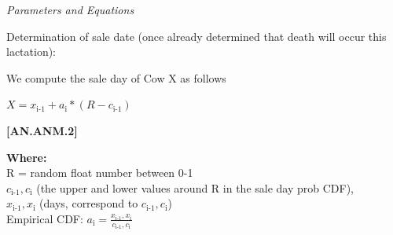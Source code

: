 \begin{refsection}
\begin{enumerate}
\begin{itemize}
         \end{itemize}


         \textit{Parameters and Equations}
         \vspace{0.1cm}

        Determination of sale date (once already determined that death will occur this lactation): 
        \vspace{0.2cm}

        We compute the sale day of Cow X as follows
        \vspace{0.5cm}
        
        \begin{center}
            \(X = x_{\text{i-1}} + a_{\text{i}} * (R - c_{\text{i-1}})\)
        \end{center}
        \vspace{0.5cm}
            
                {\raggedleft \textbf{[AN.ANM.2]}\par}
        \vspace{0.25cm}

        \textbf{Where:} \\

        \hspace*{1.5em} R = random float number between 0-1  \\

        \hspace*{1.5em} $c_{\text{i-1}},c_{\text{i}}$ (the upper and lower values around R in the sale day prob CDF),  \\

        \hspace*{1.5em} $x_{\text{i-1}},x_{\text{i}}$ (days, correspond to $c_{\text{i-1}},c_{\text{i}}$) \\

        \hspace*{1.5em} Empirical CDF: $a_{\text{i}} = \frac{x_{\text{i-1}},x_{\text{i}}}{c_{\text{i-1}},c_{\text{i}}}$ \\


\end{enumerate}
\end{refsection}
